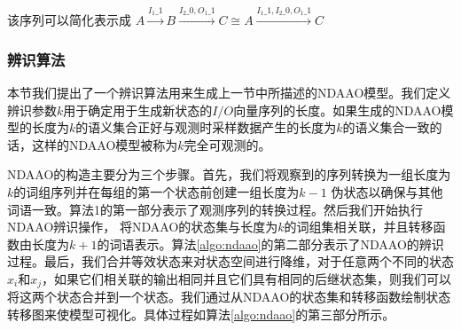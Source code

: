 该序列可以简化表示成 $A\xrightarrow{I_1\_1}B\xrightarrow{I_2\_0,O_1\_1}C\cong A\xrightarrow{I_1\_1,I_2\_0,O_1\_1}C$

\subsubsection{辨识算法}

本节我们提出了一个辨识算法用来生成上一节中所描述的NDAAO模型。我们定义辨识参数$ k $用于确定用于生成新状态的$I/O$向量序列的长度。如果生成的NDAAO模型的长度为$ k $的语义集合正好与观测时采样数据产生的长度为$k$的语义集合一致的话，这样的NDAAO模型被称为$ k $完全可观测的。

NDAAO的构造主要分为三个步骤。首先，我们将观察到的序列转换为一组长度为$ k $的词组序列并在每组的第一个状态前创建一组长度为$ k-1 $ 伪状态以确保与其他词语一致。算法1的第一部分表示了观测序列的转换过程。然后我们开始执行NDAAO辨识操作， 将NDAAO的状态集与长度为$ k $的词组集相关联，并且转移函数由长度为$ k+1 $的词语表示。算法\ref{algo:ndaao}的第二部分表示了NDAAO的辨识过程​​。最后，我们合并等效状态来对状态空间进行降维，对于任意两个不同的状态$ x_i $和$ x_j $，如果它们相关联的输出相同并且它们具有相同的后继状态集，则我们可以将这两个状态合并到一个状态。我们通过从NDAAO的状态集和转移函数绘制状态转移图来使模型可视化。具体过程如算法\ref{algo:ndaao}的第三部分所示。

